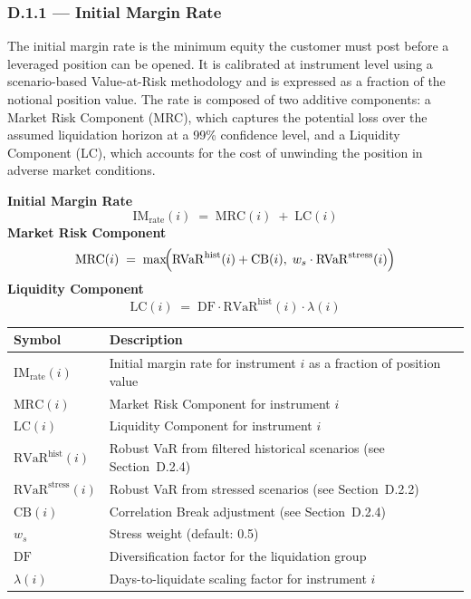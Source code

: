 \documentclass[9pt, a4paper]{extarticle}
\newenvironment{formulabox}{\par\addvspace{4pt}}{\par\addvspace{4pt}}
\newcommand{\vartableheader}{%
    \textbf{Symbol} & \textbf{Description}\\
}
\begin{document}
\subsubsection{D.1.1 — Initial Margin Rate}

The initial margin rate is the minimum equity the customer must post before a
leveraged position can be opened. It is calibrated at instrument level using a
scenario-based Value-at-Risk methodology and is expressed as a fraction of the
notional position value. The rate is composed of two additive components: a Market
Risk Component (MRC), which captures the potential loss over the assumed liquidation
horizon at a 99\% confidence level, and a Liquidity Component (LC), which accounts
for the cost of unwinding the position in adverse market conditions.

\begin{formulabox}
\textbf{Initial Margin Rate}
\begin{equation*}
    \mathrm{IM}_{\text{rate}}(i) \;=\; \mathrm{MRC}(i) \;+\; \mathrm{LC}(i)
\end{equation*}
\textbf{Market Risk Component}
\begin{equation*}
    \mathrm{MRC}(i) \;=\; \max\!\Bigl(\mathrm{RVaR}^{\text{hist}}(i) + \mathrm{CB}(i),\;
                           w_s \cdot \mathrm{RVaR}^{\text{stress}}(i)\Bigr)
\end{equation*}
\textbf{Liquidity Component}
\begin{equation*}
    \mathrm{LC}(i) \;=\; \mathrm{DF} \cdot \mathrm{RVaR}^{\text{hist}}(i) \cdot \lambda(i)
\end{equation*}
\end{formulabox}

\begin{tabularx}{\linewidth}{lX}
\toprule
\vartableheader
\midrule
$\mathrm{IM}_{\text{rate}}(i)$      & Initial margin rate for instrument $i$ as a fraction of position value \\
$\mathrm{MRC}(i)$                   & Market Risk Component for instrument $i$ \\
$\mathrm{LC}(i)$                    & Liquidity Component for instrument $i$ \\
$\mathrm{RVaR}^{\text{hist}}(i)$    & Robust VaR from filtered historical scenarios (see Section~D.2.4) \\
$\mathrm{RVaR}^{\text{stress}}(i)$  & Robust VaR from stressed scenarios (see Section~D.2.2) \\
$\mathrm{CB}(i)$                    & Correlation Break adjustment (see Section~D.2.4) \\
$w_s$                               & Stress weight (default: 0.5) \\
$\mathrm{DF}$                       & Diversification factor for the liquidation group \\
$\lambda(i)$                        & Days-to-liquidate scaling factor for instrument $i$ \\
\bottomrule
\end{tabularx}
\end{document}
